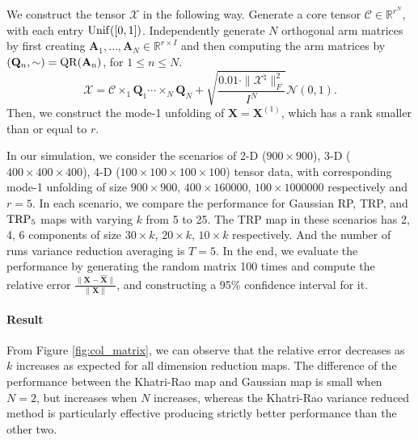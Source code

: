 We construct the tensor $\mathscr{X}$ in the following way. Generate a core tensor $\mathscr{C} \in \mathbb{R}^{r^N}$, with each entry $\rm{Unif}([0,1])$. Independently generate $N$ orthogonal arm matrices by first creating $\mathbf{A}_1, \dots, \mathbf{A}_N \in \mathbb{R}^{r \times I}$ and then computing the arm matrices by $(\mathbf{Q}_n, \sim) = \rm{QR}(\mathbf{A}_n)$, for $1 \leq n \leq N$.
\begin{equation}
\mathscr{X} = \mathscr{C} \times_1 \mathbf{Q}_1 \cdots \times_N \mathbf{Q}_N + \sqrt{\frac{0.01 \cdot \|\mathscr{X}^\natural\|_F^2}{I^N}} \mathcal{N}(0,1). \nonumber
\end{equation}
Then, we construct the mode-1 unfolding of $\mathbf{X} = \mathbf{X}^{(1)}$, which has a rank smaller than or equal to $r$. 

In our simulation, we consider the scenarios of 2-D ($900 \times 900$), 3-D ($400 \times 400 \times 400$), 4-D ($100 \times 100 \times 100 \times 100$) tensor data, with corresponding mode-1 unfolding of size $900 \times 900$, $400 \times 160000$, $100 \times 1000000$ respectively and $r = 5$. In each scenario, we compare the performance for Gaussian RP, TRP, and $\textup{TRP}_5$ maps with varying $k$ from 5 to 25. The TRP map in these scenarios has 2, 4, 6 components of size $30 \times k$, $20 \times k$, $10 \times k$ respectively. And the number of runs variance reduction averaging is $T = 5$. In the end, we evaluate the performance by generating the random matrix 100 times and compute the relative error $\frac{\|\mathbf{X} - \hat{\mathbf{X}}\|}{\|\mathbf{X}\|}$, and constructing a 95\% confidence interval for it.

\paragraph{Result}From Figure \ref{fig:col_matrix}, we can observe that the relative error decreases as $k$ increases as expected for all dimension reduction maps. The difference of the performance between the Khatri-Rao map and Gaussian map is small when $N = 2$, but increases when $N$ increases, whereas the Khatri-Rao variance reduced method is particularly effective producing strictly better performance than the other two. 


